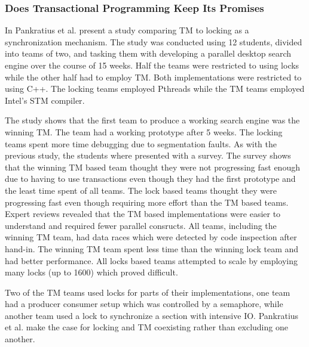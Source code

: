\subsubsection{Does Transactional Programming Keep Its Promises}
\label{sec:stm_ease_pankratius}
In \cite{pankratius2009does} Pankratius et al. present a study comparing \ac{TM} to locking as a synchronization mechanism. The study was conducted using 12 students, divided into teams of two, and tasking them with developing a parallel desktop search engine over the course of 15 weeks. Half the teams were restricted to using locks while the other half had to employ \ac{TM}. Both implementations were restricted to using C++. The locking teams employed Pthreads\cite[p. 2]{pankratius2009does} while the \ac{TM} teams employed Intel’s STM compiler\cite[p. 3]{pankratius2009does}.

The study shows that the first team to produce a working search engine was the winning \ac{TM}\cite[p. 6]{pankratius2009does}. The team had a working prototype after 5 weeks.   The locking teams spent more time debugging due to segmentation faults\cite[p. 6]{pankratius2009does}. As with the previous study, the students where presented with a survey. The survey shows that the  winning \ac{TM} based team thought they were not progressing fast enough due to having to use transactions even though they had the first prototype and the least time spent of all teams\cite[p. 7]{pankratius2009does}. The lock based teams thought they were progressing fast even though requiring more effort than the \ac{TM} based teams\cite[p. 6]{pankratius2009does}. Expert reviews revealed that the \ac{TM} based implementations were easier to understand and required fewer parallel consructs\cite[p. 6]{pankratius2009does}. All teams, including the winning \ac{TM} team, had data races which were detected by code inspection after hand-in\cite[p. 6]{pankratius2009does}. The winning \ac{TM} team spent less time than the winning lock team and had better performance\cite[p. 23]{pankratius2009does}. All locks based teams attempted to scale by employing many locks (up to 1600) which proved difficult\cite[p. 23]{pankratius2009does}.

Two of the \ac{TM} teams used locks for parts of their implementations, one team had a producer consumer setup which was controlled by a semaphore, while another team used a lock to synchronize a section with intensive \ac{IO}\cite[p. 5]{pankratius2009does}. Pankratius et al. make the case for locking and \ac{TM} coexisting rather than excluding one another.

